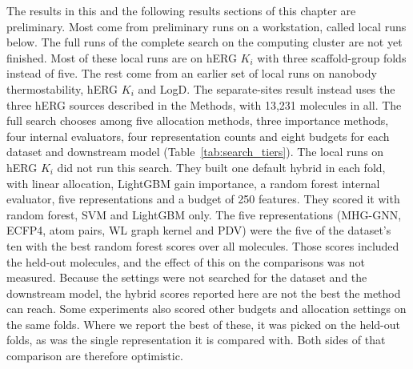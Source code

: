 
\label{sec:method:results_single}


The results in this and the following results sections of this chapter are preliminary. Most come from preliminary runs on a workstation, called local runs below. The full runs of the complete search on the computing cluster are not yet finished. Most of these local runs are on hERG $K_i$ with three scaffold-group folds instead of five. The rest come from an earlier set of local runs on nanobody thermostability, hERG $K_i$ and LogD. The separate-sites result instead uses the three hERG sources described in the Methods, with 13,231 molecules in all. The full search chooses among five allocation methods, three importance methods, four internal evaluators, four representation counts and eight budgets for each dataset and downstream model (Table~\ref{tab:search_tiers}). The local runs on hERG $K_i$ did not run this search. They built one default hybrid in each fold, with linear allocation, LightGBM gain importance, a random forest internal evaluator, five representations and a budget of 250 features. They scored it with random forest, SVM and LightGBM only. The five representations (MHG-GNN, ECFP4, atom pairs, WL graph kernel and PDV) were the five of the dataset's ten with the best random forest scores over all molecules. Those scores included the held-out molecules, and the effect of this on the comparisons was not measured. Because the settings were not searched for the dataset and the downstream model, the hybrid scores reported here are not the best the method can reach. Some experiments also scored other budgets and allocation settings on the same folds. Where we report the best of these, it was picked on the held-out folds, as was the single representation it is compared with. Both sides of that comparison are therefore optimistic.


